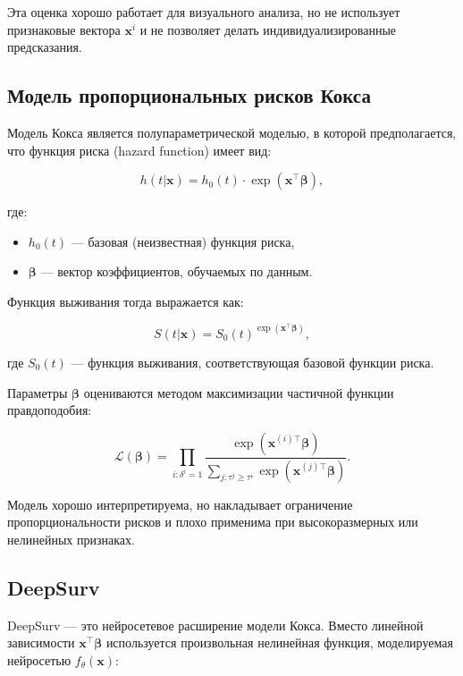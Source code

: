\documentclass[a4paper,14pt,oneside,openany]{memoir}
\begin{document}
Эта оценка хорошо работает для визуального анализа, но не использует признаковые вектора $\mathbf{x}^i$ и не позволяет делать индивидуализированные предсказания.

\subsection{Модель пропорциональных рисков Кокса}

Модель Кокса \cite{Cox1972} является полупараметрической моделью, в которой предполагается, что функция риска (hazard function) имеет вид:

\begin{equation}
	h(t|\mathbf{x}) = h_0(t) \cdot \exp(\mathbf{x}^\top \boldsymbol{\beta}),
\end{equation}

где:
\begin{itemize}
	\item $h_0(t)$ — базовая (неизвестная) функция риска,
	\item $\boldsymbol{\beta}$ — вектор коэффициентов, обучаемых по данным.
\end{itemize}

Функция выживания тогда выражается как:

\begin{equation}
	S(t|\mathbf{x}) = S_0(t)^{\exp(\mathbf{x}^\top \boldsymbol{\beta})},
\end{equation}

где $S_0(t)$ — функция выживания, соответствующая базовой функции риска.

Параметры $\boldsymbol{\beta}$ оцениваются методом максимизации частичной функции правдоподобия:

\begin{equation}
	\mathcal{L}(\boldsymbol{\beta}) = \prod_{i:\delta^i=1} \frac{\exp(\mathbf{x}^{(i)\top} \boldsymbol{\beta})}{\sum_{j:\tau^j \geq \tau^i} \exp(\mathbf{x}^{(j)\top} \boldsymbol{\beta})}.
\end{equation}

Модель хорошо интерпретируема, но накладывает ограничение пропорциональности рисков и плохо применима при высокоразмерных или нелинейных признаках.

\subsection{DeepSurv}

DeepSurv \cite{Katzman2018} — это нейросетевое расширение модели Кокса. Вместо линейной зависимости $\mathbf{x}^\top \boldsymbol{\beta}$ используется произвольная нелинейная функция, моделируемая нейросетью $f_\theta(\mathbf{x})$:
\end{document}
